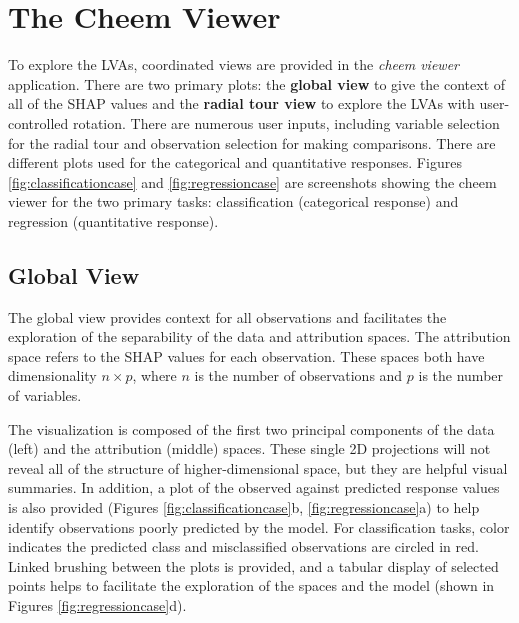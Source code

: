 \documentclass[
]{jss}
\begin{document}
\hypertarget{sec:cheemviewer}{%
\section{The Cheem Viewer}\label{sec:cheemviewer}}

To explore the LVAs, coordinated views \citep{roberts_state_2007}
\citep[also known as ensemble graphics,][]{unwin_ensemble_2018} are
provided in the \emph{cheem viewer} application. There are two primary
plots: the \textbf{global view} to give the context of all of the SHAP
values and the \textbf{radial tour view} to explore the LVAs with
user-controlled rotation. There are numerous user inputs, including
variable selection for the radial tour and observation selection for
making comparisons. There are different plots used for the categorical
and quantitative responses. Figures \ref{fig:classificationcase} and
\ref{fig:regressioncase} are screenshots showing the cheem viewer for
the two primary tasks: classification (categorical response) and
regression (quantitative response).

\hypertarget{global-view}{%
\subsection{Global View}\label{global-view}}

The global view provides context for all observations and facilitates
the exploration of the separability of the data and attribution spaces.
The attribution space refers to the SHAP values for each observation.
These spaces both have dimensionality \(n \times p\), where \(n\) is the
number of observations and \(p\) is the number of variables.

The visualization is composed of the first two principal components of
the data (left) and the attribution (middle) spaces. These single 2D
projections will not reveal all of the structure of higher-dimensional
space, but they are helpful visual summaries. In addition, a plot of the
observed against predicted response values is also provided (Figures
\ref{fig:classificationcase}b, \ref{fig:regressioncase}a) to help
identify observations poorly predicted by the model. For classification
tasks, color indicates the predicted class and misclassified
observations are circled in red. Linked brushing between the plots is
provided, and a tabular display of selected points helps to facilitate
the exploration of the spaces and the model (shown in Figures
\ref{fig:regressioncase}d).
\end{document}
